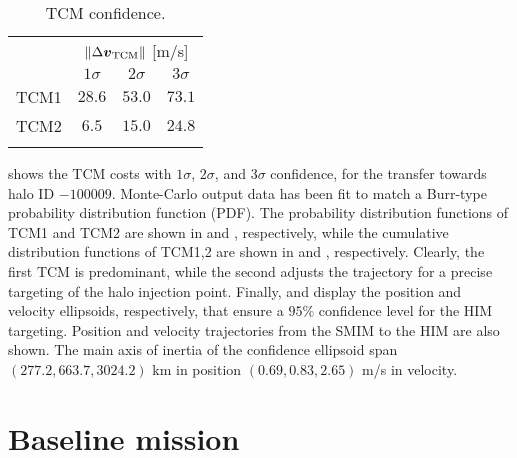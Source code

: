 %
\begin{table}[b!]
	\caption{TCM confidence.}
	\label{tab:TCMconfidence}
	\centering
	\footnotesize
	\begin{tabular}{cccc}
		\TOPlines
		\multirow{2}{*}{TCM} & \multicolumn{3}{c}{$\|\Delta\boldsymbol{v}_{\textrm{TCM}}\|$ [m/s]} \\
		& $1\sigma$ & $2\sigma$ & $3\sigma$ \\
		\MIDline
		TCM1 & $28.6$ & $53.0$ & $73.1$ \\
		TCM2 & $6.5$ & $15.0$ & $24.8$ \\
		\BOTTOMlines
	\end{tabular}
\end{table}
%
 shows the {TCM} costs with $1\sigma$, $2\sigma$, and $3\sigma$ confidence, for the transfer towards halo ID $-100009$. Monte-Carlo output data has been fit to match a Burr-type probability distribution function (PDF). The probability distribution functions of TCM1 and TCM2 are shown in  and , respectively, while the cumulative distribution functions of TCM1,2 are shown in  and , respectively. Clearly, the first {TCM} is predominant, while the second adjusts the trajectory for a precise targeting of the halo injection point. Finally,  and  display the position and velocity ellipsoids, respectively, that ensure a $95\%$ confidence level for the {HIM} targeting. Position and velocity trajectories from the {SMIM} to the {HIM} are also shown. The main axis of inertia of the confidence ellipsoid span $(277.2,663.7,3024.2)$ km in position $(0.69,0.83,2.65)$ m/s in velocity.

\section{Baseline mission} \label{sec:baseline_mission}
